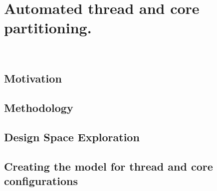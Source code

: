 %
%
%
%
%
%
%

\chapter{Automated thread and core partitioning.}~\label{chp:streamit}

\label{sec:intro}


%

\section{Motivation}\label{sec:motiviation}


\section{Methodology}\label{chp:stream:sec:setup}


\section{Design Space Exploration}\label{sec:streamit:dse}


\section{Creating the model for thread and core configurations}\label{sec:ml}

\label{chp:streamit:sec:core}


